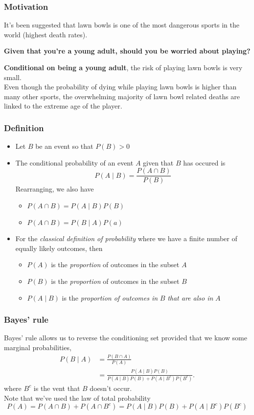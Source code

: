 \documentclass[a4paper]{article}\usepackage[]{graphicx}\usepackage[]{xcolor}
\begin{document}
\subsubsection{Motivation}
It's been suggested that lawn bowls is one of the most dangerous sports in the world (highest death rates).
\begin{greenbox}
	\textbf{Given that you're a young adult, should you be worried about playing?}
\end{greenbox}
\textbf{Conditional on being a young adult}, the risk of playing lawn bowls is very small.\\
Even though the probability of dying while playing lawn bowls is higher than many other sports, the overwhelming majority of lawn bowl related deaths are linked to the extreme age of the player.
\subsubsection{Definition}
\begin{itemize}
	\item Let \( B \) be an event so that \( P(B) > 0 \)
	\item The conditional probability of an event \( A \) given that \( B \) has occured is
	\[
		P(A \mid B) = \frac{P(A \cap B)}{P(B)}
	\]
	Rearranging, we also have
	\begin{itemize}
		\item \( P(A \cap B) = P(A \mid B)P(B) \) 
		\item \( P(A \cap B) = P(B \mid A)P(a) \) 
	\end{itemize}
	\item For the \textit{classical definition of probability} where we have a finite number of equally likely outcomes, then
	\begin{itemize}
		\item \( P(A) \) is the \textit{proportion} of outcomes in the subset \( A \) 
		\item \( P(B) \) is the \textit{proportion} of outcomes in the subset \( B \) 
		\item \( P(A \mid B) \) is the \textit{proportion of outcomes in} \( B \) \textit{that are also in} \( A \) 
	\end{itemize}
\end{itemize}
\subsubsection{Bayes' rule}
Bayes' rule allows us to reverse the conditioning set provided that we know some marginal probabilities,
\begin{align*}
		P(B \mid A) & = \frac{P(B\cap A)}{P(A)} \\
		& = \frac{P(A \mid B) P(B)}{P(A \mid B) P(B) + P(A \mid B^c)P(B^c)}.
\end{align*}
where \( B^{c} \) is the vent that \( B \) doesn't occur.\\
Note that we've used the \textcolor{myred}{law of total probability}
\[
	P(A) = P(A\cap B) + P(A\cap B^c) =  P(A \mid B) P(B) + P(A \mid B^c)P(B^c)
\]
\end{document}
